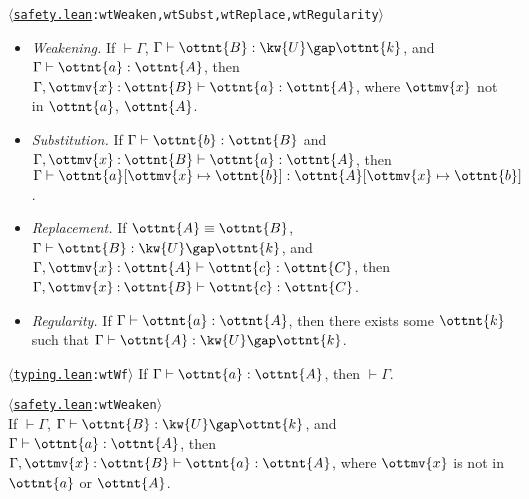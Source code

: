 \documentclass[a4paper,UKenglish,cleveref,autoref,thm-restate]{lipics-v2021}
\newcommand{\repo}{https://github.com/ionathanch/TTBFL}
\newcommand{\thmref}[2]{%
  $\langle$\href{\repo/tree/main/src/#1}{\texttt{#1}}\texttt{:#2}$\rangle$%
}
\begin{document}
\begin{lemma} \thmref{safety.lean}{wtWeaken,wtSubst,wtReplace,wtRegularity} \label{lem:wt:preservation}
  \begin{itemize}
    \item \textit{Weakening.} If $ \mathop{\vdash}  \Gamma $, $ \Gamma  \vdash  \ottnt{B}  \mathrel{:}   \kw{U} \gap  \ottnt{k}  $, and $ \Gamma  \vdash  \ottnt{a}  \mathrel{:}  \ottnt{A} $,
      then $  \Gamma ,  \ottmv{x}  \mathbin{:}  \ottnt{B}   \vdash  \ottnt{a}  \mathrel{:}  \ottnt{A} $, where $\ottmv{x}$ not in $\ottnt{a}$, $\ottnt{A}$.
    \item \textit{Substitution.} If $ \Gamma  \vdash  \ottnt{b}  \mathrel{:}  \ottnt{B} $ and $  \Gamma ,  \ottmv{x}  \mathbin{:}  \ottnt{B}   \vdash  \ottnt{a}  \mathrel{:}  \ottnt{A} $,
      then $ \Gamma  \vdash   \ottnt{a} [  \ottmv{x}  \mapsto  \ottnt{b}  ]   \mathrel{:}   \ottnt{A} [  \ottmv{x}  \mapsto  \ottnt{b}  ]  $.
    \item \textit{Replacement.} If $ \ottnt{A}  \equiv  \ottnt{B} $, $ \Gamma  \vdash  \ottnt{B}  \mathrel{:}   \kw{U} \gap  \ottnt{k}  $, and $  \Gamma ,  \ottmv{x}  \mathbin{:}  \ottnt{A}   \vdash  \ottnt{c}  \mathrel{:}  \ottnt{C} $,
      then $  \Gamma ,  \ottmv{x}  \mathbin{:}  \ottnt{B}   \vdash  \ottnt{c}  \mathrel{:}  \ottnt{C} $.
    \item \textit{Regularity.} If $ \Gamma  \vdash  \ottnt{a}  \mathrel{:}  \ottnt{A} $, then there exists some $\ottnt{k}$ such that
      $ \Gamma  \vdash  \ottnt{A}  \mathrel{:}   \kw{U} \gap  \ottnt{k}  $.
  \end{itemize}
\end{lemma}

\iffalse
\begin{lemma} \thmref{typing.lean}{wtWf} \label{lem:wt:wf}
  If $ \Gamma  \vdash  \ottnt{a}  \mathrel{:}  \ottnt{A} $, then $ \mathop{\vdash}  \Gamma $.  
\end{lemma}

\begin{lemma}[Weakening (w.t.)] \thmref{safety.lean}{wtWeaken} \label{lem:wt:weak} \\
  If $ \mathop{\vdash}  \Gamma $, $ \Gamma  \vdash  \ottnt{B}  \mathrel{:}   \kw{U} \gap  \ottnt{k}  $, and $ \Gamma  \vdash  \ottnt{a}  \mathrel{:}  \ottnt{A} $,
  then $  \Gamma ,  \ottmv{x}  \mathbin{:}  \ottnt{B}   \vdash  \ottnt{a}  \mathrel{:}  \ottnt{A} $, where $\ottmv{x}$ is not in $\ottnt{a}$ or $\ottnt{A}$.
\end{lemma}
\end{document}
